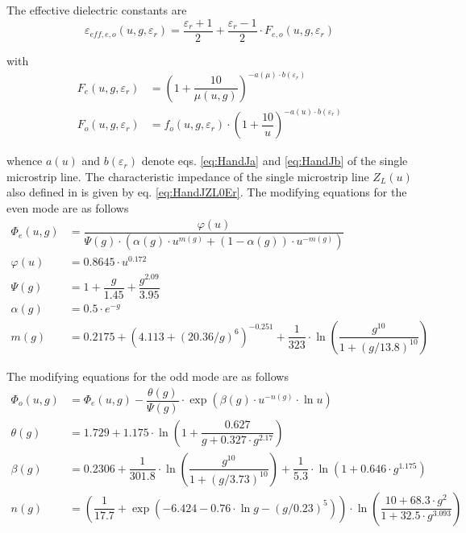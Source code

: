 \documentclass[10pt]{report}
\begin{document}
The effective dielectric constants are
\begin{equation}
\varepsilon_{eff,e,o}\left(u,g,\varepsilon_r\right) = \dfrac{\varepsilon_r+1}{2} + \dfrac{\varepsilon_r-1}{2}\cdot F_{e,o}\left(u,g,\varepsilon_r\right)
\end{equation}

with
\begin{align}
F_{e}\left(u,g,\varepsilon_r\right) &= \left(1+\dfrac{10}{\mu\left(u,g\right)}\right)^{-a(\mu)\cdot b\left(\varepsilon_r\right)}\\
F_{o}\left(u,g,\varepsilon_r\right) &= f_o\left(u,g,\varepsilon_r\right)\cdot \left(1+\dfrac{10}{u}\right)^{-a\left(u\right)\cdot b\left(\varepsilon_r\right)}
\end{align}

whence $a(u)$ and $b\left(\varepsilon_r\right)$ denote
eqs. \eqref{eq:HandJa} and \eqref{eq:HandJb} of the single microstrip
line.  The characteristic impedance of the single microstrip line
$Z_L\left(u\right)$ also defined in \cite{Hammerstad} is given by
eq. \eqref{eq:HandJZL0Er}.  The modifying equations for the even mode
are as follows
\begin{align}
\Phi_e\left(u,g\right) &= \dfrac{\varphi(u)}{\Psi(g)\cdot \left(\alpha(g)\cdot u^{m(g)} +\left(1-\alpha(g)\right)\cdot u^{-m(g)}\right)}\\
\varphi(u) &= 0.8645\cdot u^{0.172}\\
\Psi(g) &= 1 + \dfrac{g}{1.45} + \dfrac{g^{2.09}}{3.95}\\
\alpha(g) &= 0.5\cdot e^{-g}\\
m(g) &= 0.2175+\left(4.113+\left(20.36/g\right)^6\right)^{-0.251} +\dfrac{1}{323}\cdot\ln{\left(\dfrac{g^{10}}{1+\left(g/13.8\right)^{10}}\right)}
\end{align}

The modifying equations for the odd mode are as follows
\begin{align}
\Phi_o\left(u,g\right) &= \Phi_e\left(u,g\right)-\dfrac{\theta(g)}{\Psi(g)}\cdot \exp{\left(\beta(g)\cdot u^{-n(g)}\cdot\ln{u}\right)}\\
\theta(g) &= 1.729+1.175\cdot\ln{\left(1+\dfrac{0.627}{g+0.327\cdot g^{2.17}}\right)}\\
\beta(g) &= 0.2306+\dfrac{1}{301.8}\cdot\ln{\left(\dfrac{g^{10}}{1+\left(g/3.73\right)^{10}}\right)} +\dfrac{1}{5.3}\cdot\ln{\left(1+0.646\cdot g^{1.175}\right)}\\
n(g) &= \left(\dfrac{1}{17.7} + \exp{\left(-6.424 - 0.76\cdot \ln{g} - \left(g/0.23\right)^5\right)}\right)\cdot \ln{\left(\dfrac{10 + 68.3\cdot g^2}{1+32.5\cdot g^{3.093}}\right)}
\end{align}
\end{document}
